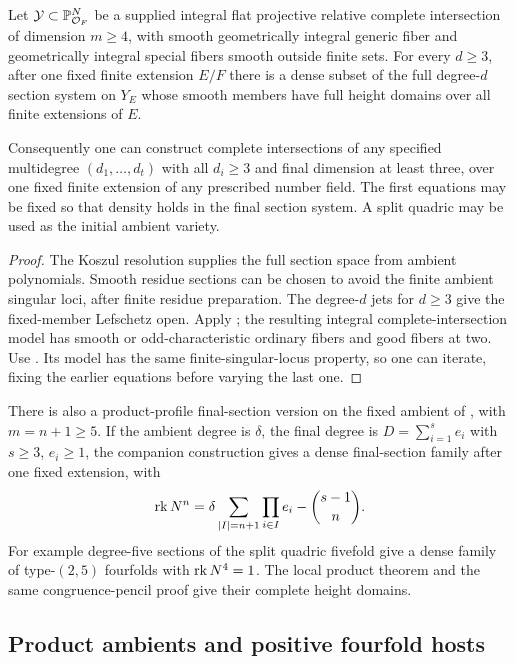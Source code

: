 \begin{theorem}\label{thm:dense-ci}
Let $\mathcal Y\subset\mathbb P^N_{\mathcal O_F}$ be a supplied
integral flat projective relative complete intersection of dimension
$m\geq4$, with smooth geometrically integral generic fiber and
geometrically integral special fibers smooth outside finite sets.
For every $d\geq3$, after one fixed finite extension $E/F$ there
is a dense subset of the full degree-$d$ section system on $Y_E$
whose smooth members have full height domains over all finite
extensions of $E$.

Consequently one can construct complete intersections of any
specified multidegree $(d_1,\ldots,d_t)$ with all $d_i\geq3$
and final dimension at least three, over one fixed finite extension
of any prescribed number field. The first equations may be fixed
so that density holds in the final section system. A split quadric
may be used as the initial ambient variety.
\end{theorem}

\begin{proof}
The Koszul resolution supplies the full section space from ambient
polynomials. Smooth residue sections can be chosen to avoid the
finite ambient singular loci, after finite residue preparation.
The degree-$d$ jets for $d\geq3$ give the fixed-member Lefschetz
open. Apply ; the resulting integral
complete-intersection model has smooth or odd-characteristic
ordinary fibers and good fibers at two. Use
. Its model has the same finite-singular-locus
property, so one can iterate, fixing the earlier equations before
varying the last one.
\end{proof}

There is also a product-profile final-section version on the fixed
ambient of , with $m=n+1\geq5$. If the
ambient degree is $\delta$, the final degree is
$D=\sum_{i=1}^s e_i$ with $s\geq3$, $e_i\geq1$, the companion
construction gives a dense final-section family after one fixed
extension, with
\[
 \operatorname{rk} N^n=\delta\sum_{|I|=n+1}\prod_{i\in I}e_i
                                      -\binom{s-1}{n}.
\]
For example degree-five sections of the split quadric fivefold
give a dense family of type-$(2,5)$ fourfolds with $\operatorname{rk} N^4=1$.
The local product theorem and the same congruence-pencil proof
give their complete height domains.

\subsection{Product ambients and positive fourfold hosts}

